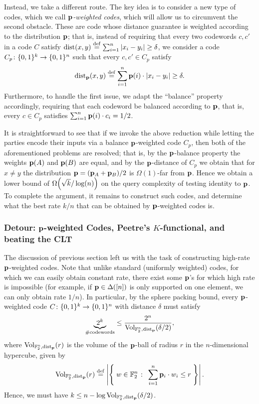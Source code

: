 Instead, we take a different route. The key idea is to consider a new type of codes, which we call \emph{$\p$-weighted codes}, which will allow us to circumvent the second obstacle. These are code whose distance guarantee is weighted according to the distribution $\p$; that is, instead of requiring that every two codewords $c,c'$ in a code $C$ satisfy $\dist{x}{y} \eqdef \sum_{i=1}^{n} \abs{ x_i - y_i } \geq \delta$, we consider a code $C_p\colon \bitset^k \to \bitset^n$ such that every $c,c' \in C_p$ satisfy
\[
    \pdist[\p]{x}{y} \eqdef \sum_{i=1}^{n} \p(i)\cdot\abs{ x_i - y_i } \geq \delta.
\]
Furthermore, to handle the first issue, we adapt the ``balance'' property accordingly, requiring that each codeword be balanced according to $\p$, that is, every $c \in C_p$ satisfies $\sum_{i=1}^{n} \p(i)\cdot c_i = 1/2$.

It is straightforward to see that if we invoke the above reduction while letting the parties encode their inputs via a balance $\p$-weighted code $C_p$, then both of the aforementioned problems are resolved; that is, by the $\p$-balance property the weights $\p(A)$ and $\p(B)$ are equal, and by the $\p$-distance of $C_p$ we obtain that for $x \neq y$ the distribution $\q = (\p_A + \p_B)/2$ is $\Omega(1)$-far from $\p$. Hence we obtain a lower bound of $\bigOmega{ \sqrt{k}/\log(n) }$ on the query complexity of testing identity to $\p$. To complete the argument, it remains to construct such codes, and determine what the best rate $k/n$ that can be obtained by $\p$-weighted codes is.

\subsubsection{Detour: $\p$-weighted Codes, Peetre's $K$-functional, and beating the CLT}
\label{sec:overview:detour}
The discussion of previous section left us with the task of constructing high-rate $\p$-weighted codes. Note that unlike standard (uniformly weighted) codes, for which we can easily obtain constant rate, there exist some $\p$'s for which high rate is impossible (for example, if $\p\in\distribs{[n]}$ is only supported on one element, we can only obtain rate $1/n$). In particular, by the sphere packing bound, every $\p$-weighted code $C\colon\bitset^k \to\bitset^n$ with distance $\delta$  must satisfy
\[
      \underbrace{2^k}_{\#\text{codewords}} \leq \frac{2^n}{\operatorname{Vol}_{\mathbb{F}_2^n,\pdistfunc[\p]}(\delta/2) },
\]
where $\operatorname{Vol}_{\mathbb{F}_2^n,\pdistfunc[\p]}(r)$ is the volume of the $\p$-ball of radius $r$ in the $n$-dimensional hypercube, given by
\[
 \operatorname{Vol}_{\mathbb{F}_2^n,\pdistfunc[\p]}(r) 
    \eqdef \abs{ \setOfSuchThat{w\in \mathbb{F}_2^n }{\sum_{i=1}^{n} \p_i\cdot w_i \leq r } }.
\]
Hence, we must have $k \leq n - \log \operatorname{Vol}_{\mathbb{F}_2^n,\pdistfunc[\p]}(\delta/2)$.

